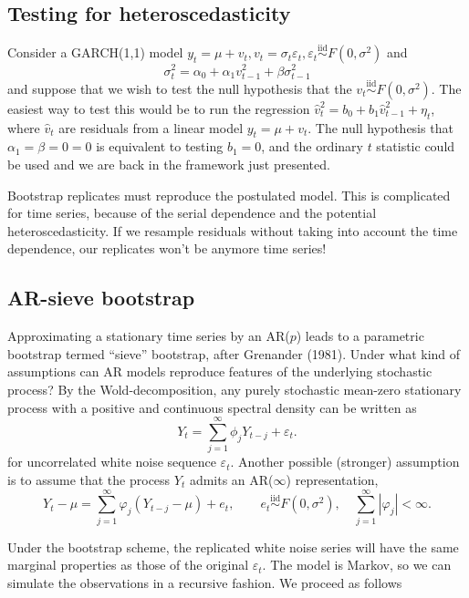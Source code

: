 \documentclass[]{book}
\begin{document}
\subsection{Testing for
heteroscedasticity}\label{testing-for-heteroscedasticity}

Consider a GARCH(1,1) model
\(y_t=\mu + v_t, v_t = \sigma_t\varepsilon_t, \varepsilon_t \stackrel{\mathrm{iid}}{\sim}F(0,\sigma^2)\)
and
\[\sigma^2_t = \alpha_0 + \alpha_1 v_{t-1}^2 + \beta \sigma^2_{t-1}\]
and suppose that we wish to test the null hypothesis that the
\(v_t \stackrel{\mathrm{iid}}{\sim}F(0,\sigma^2)\). The easiest way to
test this would be to run the regression
\(\widehat{v}_t^2 = b_0 + b_1 \widehat{v}_{t-1}^2 + \eta_t\), where
\(\widehat{v}_t\) are residuals from a linear model \(y_t=\mu +v_t\).
The null hypothesis that \(\alpha_1=\beta=0=0\) is equivalent to testing
\(b_1=0\), and the ordinary \(t\) statistic could be used and we are
back in the framework just presented.

Bootstrap replicates must reproduce the postulated model. This is
complicated for time series, because of the serial dependence and the
potential heteroscedasticity. If we resample residuals without taking
into account the time dependence, our replicates won't be anymore time
series!

\subsection{AR-sieve bootstrap}\label{ar-sieve-bootstrap}

Approximating a stationary time series by an AR(\(p\)) leads to a
parametric bootstrap termed ``sieve'' bootstrap, after Grenander (1981).
Under what kind of assumptions can AR models reproduce features of the
underlying stochastic process? By the Wold-decomposition, any purely
stochastic mean-zero stationary process with a positive and continuous
spectral density can be written as
\[Y_t= \sum_{j=1}^\infty \phi_j Y_{t-j} + \varepsilon_t.\] for
uncorrelated white noise sequence \(\varepsilon_t\). Another possible
(stronger) assumption is to assume that the process \(Y_t\) admits an
AR(\(\infty\)) representation,
\[Y_t-\mu=\sum_{j=1}^\infty \varphi_j (Y_{t-j}-\mu) + e_t, \qquad e_t \stackrel{\mathrm{iid}}{\sim}F(0, \sigma^2), \quad \sum_{j=1}^\infty |\varphi_j| < \infty.\]

Under the bootstrap scheme, the replicated white noise series will have
the same marginal properties as those of the original \(\varepsilon_t\).
The model is Markov, so we can simulate the observations in a recursive
fashion. We proceed as follows
\end{document}
